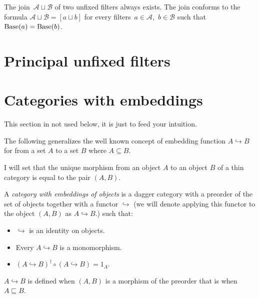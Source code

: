 \begin{cor}
The join~$\mathcal{A}\sqcup\mathcal{B}$ of two unfixed filters always exists.
The join conforms to the formula
$\mathcal{A}\sqcup\mathcal{B}=[a\sqcup b]$ for every
filters~$a\in\mathcal{A}$,~$b\in\mathcal{B}$ such that
$\operatorname{Base}(a)=\operatorname{Base}(b)$.
\end{cor}


\section{Principal unfixed filters}


\section{Categories with embeddings}

\begin{note}
  This section in not used below, it is just to feed your intuition.
\end{note}

The following generalizes the well known concept of embedding function $A
\hookrightarrow B$ for from a set $A$ to a set $B$ where $A \subseteq B$.

I will set that the unique morphism from an object $A$ to an object $B$ of a
thin category is equal to the pair $(A , B)$.

\begin{defn}
  A \emph{category with embeddings of objects} is a dagger category with a
  preorder of the set of objects together with a functor $\hookrightarrow$ (we
  will denote applying this functor to the object $(A , B)$ as $A
  \hookrightarrow B$.) such that:
  \begin{itemize}
    \item $\hookrightarrow$ is an identity on objects.
    
    \item Every $A \hookrightarrow B$ is a monomorphism.
    
    \item $(A \hookrightarrow B)^{\dagger} \circ (A \hookrightarrow B) = 1_A$.
  \end{itemize}
\end{defn}

\begin{obvious}
$A\hookrightarrow B$ is defined when $(A , B)$ is a morphism of the preorder
that is when $A \sqsubseteq B$.
\end{obvious}

